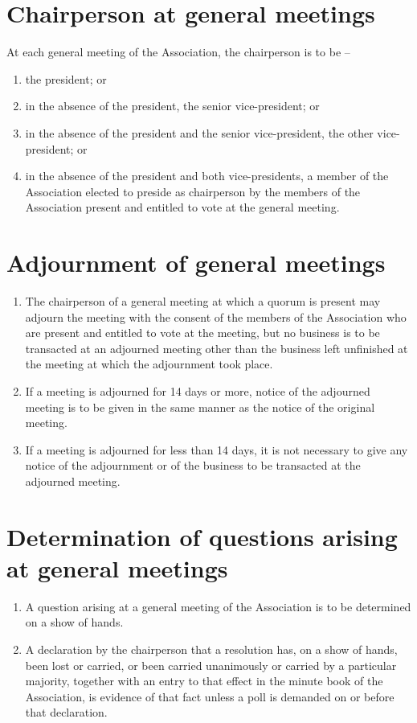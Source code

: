 \documentclass[a4paper,11pt]{article}
\begin{document}
\section{Chairperson at general meetings}
At each general meeting of the Association, the chairperson is to be --
\begin{enumerate}
	\item the president; or
	\item in the absence of the president, the senior vice-president; or
	\item in the absence of the president and the senior vice-president, the other vice-president; or
	\item in the absence of the president and both vice-presidents, a member of the Association elected to preside as chairperson by the members of the Association present and entitled to vote at the general meeting.
\end{enumerate}

\section{Adjournment of general meetings}
\begin{enumerate}
	\item The chairperson of a general meeting at which a quorum is present may adjourn the meeting with the consent of the members of the Association who are present and entitled to vote at the meeting, but no business is to be transacted at an adjourned meeting other than the business left unfinished at the meeting at which the adjournment took place.
	\item If a meeting is adjourned for 14 days or more, notice of the adjourned meeting is to be given in the same manner as the notice of the original meeting.
	\item If a meeting is adjourned for less than 14 days, it is not necessary to give any notice of the adjournment or of the business to be transacted at the adjourned meeting.
\end{enumerate}

\section{Determination of questions arising at general meetings}
\begin{enumerate}
	\item A question arising at a general meeting of the Association is to be determined on a show of hands.
	\item A declaration by the chairperson that a resolution has, on a show of hands, been lost or carried, or been carried unanimously or carried by a particular majority, together with an entry to that effect in the minute book of the Association, is evidence of that fact unless a poll is demanded on or before that declaration.
\end{enumerate}
\end{document}
